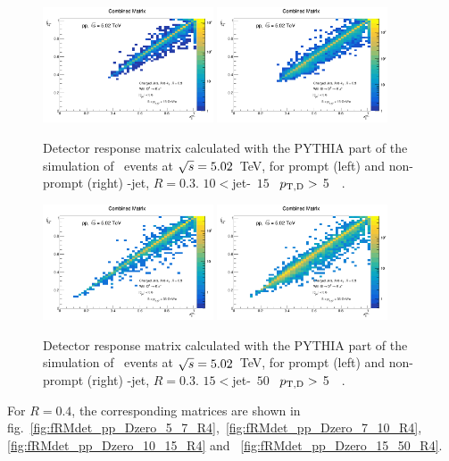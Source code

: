 \begin{figure}[bth]
\centering
\includegraphics[width=0.45\textwidth]{pp_2sig/response/R03/ProdMatrix_Jet10_15_Dpt5_15}
\includegraphics[width=0.45\textwidth]{pp_2sig/response/R03/ProdMatrixFD_Jet10_15_Dpt5_15}
\caption{Detector response matrix calculated with the PYTHIA part of the simulation of \pp\ events at $\sqrt{s}=5.02$~TeV, for prompt (left) and non-prompt (right) \Dzero-jet, $R=0.3$. $10<$jet-\pt\, $15$ \GeVc\, $p_{\mathrm{T,D}} > $ 5~\GeVc\ .}
\label{fig:fRMdet_pp_Dzero_10_15_R3}
\end{figure}

\begin{figure}[bth]
\centering
\includegraphics[width=0.45\textwidth]{pp_2sig/response/R03/ProdMatrix_Jet15_50_Dpt5_36}
\includegraphics[width=0.45\textwidth]{pp_2sig/response/R03/ProdMatrixFD_Jet15_50_Dpt5_36}
\caption{Detector response matrix calculated with the PYTHIA part of the simulation of \pp\ events at $\sqrt{s}=5.02$~TeV, for prompt (left) and non-prompt (right) \Dzero-jet, $R=0.3$. $15<$jet-\pt\, $50$ \GeVc\, $p_{\mathrm{T,D}} > $ 5~\GeVc\ .}
\label{fig:fRMdet_pp_Dzero_15_50_R3}
\end{figure}
For $R=0.4$, the corresponding matrices are shown in 
fig.~\ref{fig:fRMdet_pp_Dzero_5_7_R4},~\ref{fig:fRMdet_pp_Dzero_7_10_R4},~
\ref{fig:fRMdet_pp_Dzero_10_15_R4} and ~\ref{fig:fRMdet_pp_Dzero_15_50_R4}. 


